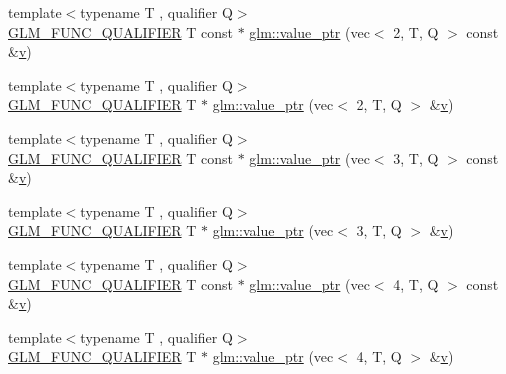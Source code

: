 \begin{DoxyCompactItemize}
\item 
{\footnotesize template$<$typename T , qualifier Q$>$ }\\\mbox{\hyperlink{setup_8hpp_a33fdea6f91c5f834105f7415e2a64407}{G\+L\+M\+\_\+\+F\+U\+N\+C\+\_\+\+Q\+U\+A\+L\+I\+F\+I\+ER}} T const  $\ast$ \mbox{\hyperlink{group__gtc__type__ptr_gaa39964028a0cfbcd18549e33feea7357}{glm\+::value\+\_\+ptr}} (vec$<$ 2, T, Q $>$ const \&\mbox{\hyperlink{_s_d_l__opengl_8h_a10a82eabcb59d2fcd74acee063775f90}{v}})
\item 
{\footnotesize template$<$typename T , qualifier Q$>$ }\\\mbox{\hyperlink{setup_8hpp_a33fdea6f91c5f834105f7415e2a64407}{G\+L\+M\+\_\+\+F\+U\+N\+C\+\_\+\+Q\+U\+A\+L\+I\+F\+I\+ER}} T $\ast$ \mbox{\hyperlink{group__gtc__type__ptr_ga54d4e779df698b9d951378dc0de5149d}{glm\+::value\+\_\+ptr}} (vec$<$ 2, T, Q $>$ \&\mbox{\hyperlink{_s_d_l__opengl_8h_a10a82eabcb59d2fcd74acee063775f90}{v}})
\item 
{\footnotesize template$<$typename T , qualifier Q$>$ }\\\mbox{\hyperlink{setup_8hpp_a33fdea6f91c5f834105f7415e2a64407}{G\+L\+M\+\_\+\+F\+U\+N\+C\+\_\+\+Q\+U\+A\+L\+I\+F\+I\+ER}} T const  $\ast$ \mbox{\hyperlink{group__gtc__type__ptr_ga1b0d55a139927496b86be0e2948279a8}{glm\+::value\+\_\+ptr}} (vec$<$ 3, T, Q $>$ const \&\mbox{\hyperlink{_s_d_l__opengl_8h_a10a82eabcb59d2fcd74acee063775f90}{v}})
\item 
{\footnotesize template$<$typename T , qualifier Q$>$ }\\\mbox{\hyperlink{setup_8hpp_a33fdea6f91c5f834105f7415e2a64407}{G\+L\+M\+\_\+\+F\+U\+N\+C\+\_\+\+Q\+U\+A\+L\+I\+F\+I\+ER}} T $\ast$ \mbox{\hyperlink{group__gtc__type__ptr_gabca52e90fd530ff2e8344d3f66326ccd}{glm\+::value\+\_\+ptr}} (vec$<$ 3, T, Q $>$ \&\mbox{\hyperlink{_s_d_l__opengl_8h_a10a82eabcb59d2fcd74acee063775f90}{v}})
\item 
{\footnotesize template$<$typename T , qualifier Q$>$ }\\\mbox{\hyperlink{setup_8hpp_a33fdea6f91c5f834105f7415e2a64407}{G\+L\+M\+\_\+\+F\+U\+N\+C\+\_\+\+Q\+U\+A\+L\+I\+F\+I\+ER}} T const  $\ast$ \mbox{\hyperlink{group__gtc__type__ptr_gace63685baa09872656962c2695900c48}{glm\+::value\+\_\+ptr}} (vec$<$ 4, T, Q $>$ const \&\mbox{\hyperlink{_s_d_l__opengl_8h_a10a82eabcb59d2fcd74acee063775f90}{v}})
\item 
{\footnotesize template$<$typename T , qualifier Q$>$ }\\\mbox{\hyperlink{setup_8hpp_a33fdea6f91c5f834105f7415e2a64407}{G\+L\+M\+\_\+\+F\+U\+N\+C\+\_\+\+Q\+U\+A\+L\+I\+F\+I\+ER}} T $\ast$ \mbox{\hyperlink{group__gtc__type__ptr_gae0ad6ab684abf10a87cadb95a9137fa2}{glm\+::value\+\_\+ptr}} (vec$<$ 4, T, Q $>$ \&\mbox{\hyperlink{_s_d_l__opengl_8h_a10a82eabcb59d2fcd74acee063775f90}{v}})

\end{DoxyCompactItemize}
